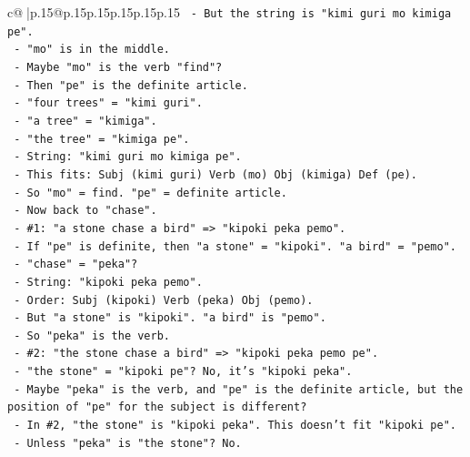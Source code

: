\documentclass{article}
\begin{document}
{\begin{supertabular}{c@{$\;$}|p{.15\linewidth}@{}p{.15\linewidth}p{.15\linewidth}p{.15\linewidth}p{.15\linewidth}p{.15\linewidth}}
{{{\texttt{                  {-} But the string is "kimi guri mo kimiga pe".} \\
\texttt{                  {-} "mo" is in the middle.} \\
\texttt{                  {-} Maybe "mo" is the verb "find"?} \\
\texttt{                  {-} Then "pe" is the definite article.} \\
\texttt{                  {-} "four trees" = "kimi guri".} \\
\texttt{                  {-} "a tree" = "kimiga".} \\
\texttt{                  {-} "the tree" = "kimiga pe".} \\
\texttt{                  {-} String: "kimi guri mo kimiga pe".} \\
\texttt{                  {-} This fits: Subj (kimi guri) Verb (mo) Obj (kimiga) Def (pe).} \\
\texttt{                  {-} So "mo" = find. "pe" = definite article.} \\
\texttt{                  {-} Now back to "chase".} \\
\texttt{                  {-} \#1: "a stone chase a bird" => "kipoki peka pemo".} \\
\texttt{                    {-} If "pe" is definite, then "a stone" = "kipoki". "a bird" = "pemo".} \\
\texttt{                    {-} "chase" = "peka"?} \\
\texttt{                    {-} String: "kipoki peka pemo".} \\
\texttt{                    {-} Order: Subj (kipoki) Verb (peka) Obj (pemo).} \\
\texttt{                    {-} But "a stone" is "kipoki". "a bird" is "pemo".} \\
\texttt{                    {-} So "peka" is the verb.} \\
\texttt{                  {-} \#2: "the stone chase a bird" => "kipoki peka pemo pe".} \\
\texttt{                    {-} "the stone" = "kipoki pe"? No, it's "kipoki peka".} \\
\texttt{                    {-} Maybe "peka" is the verb, and "pe" is the definite article, but the position of "pe" for the subject is different?} \\
\texttt{                    {-} In \#2, "the stone" is "kipoki peka". This doesn't fit "kipoki pe".} \\
\texttt{                    {-} Unless "peka" is "the stone"? No.} \\
}}}
\end{supertabular}}
\end{document}
